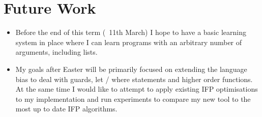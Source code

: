 \section{Future Work}

\begin{itemize}
\item Before the end of this term (~11th March) I hope to have a basic learning system in place where I can learn programs with an arbitrary number of arguments, including lists. 
\item My goals after Easter will be primarily focused on extending the language bias to deal with guards, let / where statements and higher order functions. At the same time I would like to attempt to apply existing IFP optimisations to my implementation and run experiments to compare my new tool to the most up to date IFP algorithms.
\end{itemize}

\pagebreak
%
%